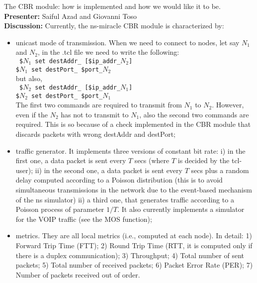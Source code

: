 \documentclass[11pt,journal,draftclsnofoot,onecolumn,twoside,letterpaper]{IEEEtran}
\theoremstyle{definition} \newtheorem{definition}[]{Definition}
\theoremstyle{theorem} \newtheorem{theorem}[]{Theorem}
\begin{document}
 The CBR module: how is implemented and how we would like it to be.\\
{\bf Presenter:} Saiful Azad and Giovanni Toso\\
{\bf Discussion:} Currently, the ns-miracle CBR module is characterized by:
\begin{itemize}
\item unicast mode of transmission. When we need to connect to nodes, let say $N_1$ and $N_2$, in the .tcl file we need to write the following:\\
{\tt
\$$N_1$ set destAddr\_ [\$ip\_addr\_$N_2$]\\
\$$N_1$ set destPort\_ \$port\_$N_2$\\
}
but also,\\
{\tt
\$$N_2$ set destAddr\_ [\$ip\_addr\_$N_1$]\\
\$$N_2$ set destPort\_ \$port\_$N_1$\\
}
The first two commands are required to transmit from $N_1$ to $N_2$. However, even if the $N_2$ has not to transmit to $N_1$, also the second two commands are required. This is so because of a check implemented in the CBR module that discards packets with wrong destAddr and destPort;
\item traffic generator. It implements three versions of constant bit rate: i) in the first one, a data packet is sent every $T$ secs (where $T$ is decided by the tcl-user); ii) in the second one, a data packet is sent every $T$ secs plus a random delay computed according to a Poisson distribution (this is to avoid simultaneous transmissions in the network due to the event-based mechanism of the ns simulator) ii) a third one, that generates traffic according to a Poisson process of parameter $1/T$. It also currently implements a simulator for the VOIP traffic (see the MOS function);  
\item metrics. They are all local metrics (i.e., computed at each node). In detail: 1) Forward Trip Time (FTT); 2) Round Trip Time (RTT, it is computed only if there is a duplex communication); 3) Throughput; 4) Total number of sent packets; 5) Total number of received packets; 6) Packet Error Rate (PER); 7) Number of packets received out of order.
\end{itemize}
\end{document}
